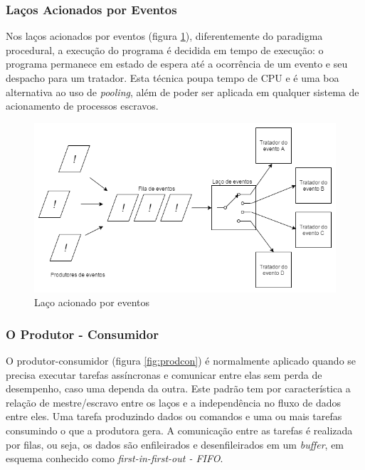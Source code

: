 \subsubsection{Laços Acionados por Eventos}
Nos laços acionados por eventos (figura \ref{fig:eventloop}), diferentemente do paradigma procedural, a execução do programa é decidida em tempo de execução: o programa permanece em estado de espera até a ocorrência de um evento e seu despacho para um tratador. Esta técnica poupa tempo de CPU e é uma boa alternativa ao uso de \textit{pooling}, além de poder ser aplicada em qualquer sistema de acionamento de processos escravos.

\begin{figure}[h]
    \centering
        \includegraphics[width=1\linewidth]{fig/patt/eventloop}
            \caption{Laço acionado por eventos}
            \label{fig:eventloop}
\end{figure}

\subsubsection{O Produtor - Consumidor}
O produtor-consumidor (figura \ref{fig:prodcon}) é normalmente aplicado quando se precisa executar tarefas assíncronas e comunicar entre elas sem perda de desempenho, caso uma dependa da outra. Este padrão tem por característica a relação de mestre/escravo entre os laços e a independência no fluxo de dados entre eles. Uma tarefa produzindo dados ou comandos e uma ou mais tarefas consumindo o que a produtora gera. A comunicação entre as tarefas é realizada por filas, ou seja, os dados são enfileirados e desenfileirados em um \textit{buffer}, em esquema conhecido como \textit{first-in-first-out - FIFO}.

